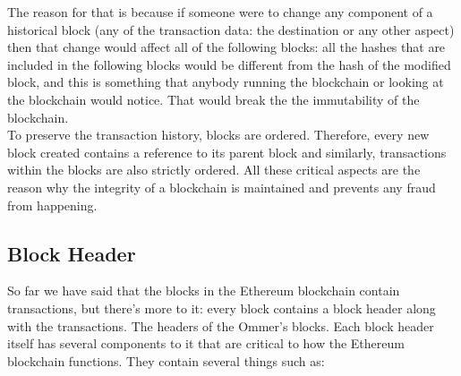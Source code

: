The reason for that is because if someone were to change any component of a historical block (any of the transaction data: the destination or any other aspect) then that change would affect all of the following blocks: all the hashes that are included in the following blocks would be different from the hash of the modified block, and this is something that anybody running the blockchain or looking at the blockchain would notice.
That would break the the immutability of the blockchain.\\

To preserve the transaction history, blocks are ordered. Therefore, every new block created contains a reference to its parent block and similarly, transactions within the blocks are also strictly ordered.
All these critical aspects are the reason why the integrity of a blockchain is maintained and prevents any fraud from happening.

\subsection*{Block Header}

So far we have said that the blocks in the Ethereum blockchain contain transactions, but there's more to it: every block contains a block header along with the transactions.
The headers of the Ommer's blocks.
Each block header itself has several components to it that are critical to how the Ethereum blockchain functions.
They contain several things such as:

